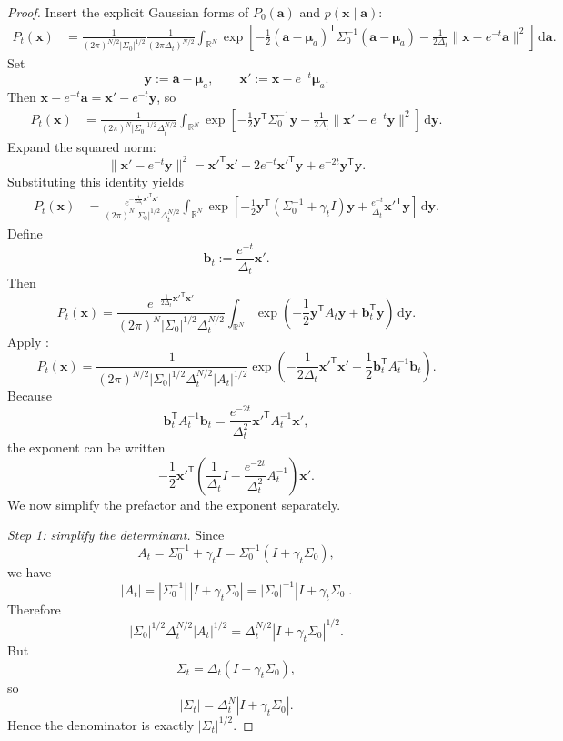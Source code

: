 \documentclass[11pt]{article}
\numberwithin{equation}{section}
\theoremstyle{definition}
\theoremstyle{remark}
\newcommand{\R}{\mathbb{R}}
\newcommand{\Id}{I}
\newcommand{\trans}{\mathsf{T}}
\newcommand{\diff}{\,\mathrm{d}}
\newcommand{\norm}[1]{\lVert #1\rVert}
\begin{document}
\begin{proof}
Insert the explicit Gaussian forms of $P_0(\mathbf a)$ and $p(\mathbf x\mid\mathbf a)$:
\begin{align*}
P_t(\mathbf x)
&=
\frac{1}{(2\pi)^{N/2}|\Sigma_0|^{1/2}}
\frac{1}{(2\pi\Delta_t)^{N/2}}
\int_{\R^N}
\exp\!\left[
-\frac12(\mathbf a-\boldsymbol{\mu}_a)^\trans\Sigma_0^{-1}(\mathbf a-\boldsymbol{\mu}_a)
-\frac{1}{2\Delta_t}\norm{\mathbf x-e^{-t}\mathbf a}^2
\right]\diff\mathbf a.
\end{align*}
Set
\[
\mathbf y:=\mathbf a-\boldsymbol{\mu}_a,
\qquad
\mathbf x':=\mathbf x-e^{-t}\boldsymbol{\mu}_a.
\]
Then $\mathbf x-e^{-t}\mathbf a=\mathbf x'-e^{-t}\mathbf y$, so
\begin{align*}
P_t(\mathbf x)
&=
\frac{1}{(2\pi)^N|\Sigma_0|^{1/2}\Delta_t^{N/2}}
\int_{\R^N}
\exp\!\left[
-\frac12\mathbf y^\trans\Sigma_0^{-1}\mathbf y
-\frac{1}{2\Delta_t}\norm{\mathbf x'-e^{-t}\mathbf y}^2
\right]\diff\mathbf y.
\end{align*}
Expand the squared norm:
\[
\norm{\mathbf x'-e^{-t}\mathbf y}^2
=
\mathbf x'^\trans\mathbf x' - 2e^{-t}\mathbf x'^\trans\mathbf y + e^{-2t}\mathbf y^\trans\mathbf y.
\]
Substituting this identity yields
\begin{align*}
P_t(\mathbf x)
&=
\frac{e^{-\frac{1}{2\Delta_t}\mathbf x'^\trans\mathbf x'}}{(2\pi)^N|\Sigma_0|^{1/2}\Delta_t^{N/2}}
\int_{\R^N}
\exp\!\left[
-\frac12\mathbf y^\trans(\Sigma_0^{-1}+\gamma_t\Id)\mathbf y
+\frac{e^{-t}}{\Delta_t}\mathbf x'^\trans\mathbf y
\right]\diff\mathbf y.
\end{align*}
Define
\[
\mathbf b_t:=\frac{e^{-t}}{\Delta_t}\mathbf x'.
\]
Then
\[
P_t(\mathbf x)
=
\frac{e^{-\frac{1}{2\Delta_t}\mathbf x'^\trans\mathbf x'}}{(2\pi)^N|\Sigma_0|^{1/2}\Delta_t^{N/2}}
\int_{\R^N}\exp\!\left(-\frac12\mathbf y^\trans A_t\mathbf y+\mathbf b_t^\trans\mathbf y\right)\diff\mathbf y.
\]
Apply :
\[
P_t(\mathbf x)
=
\frac{1}{(2\pi)^{N/2}|\Sigma_0|^{1/2}\Delta_t^{N/2}|A_t|^{1/2}}
\exp\!\left(
-\frac{1}{2\Delta_t}\mathbf x'^\trans\mathbf x'
+\frac12\mathbf b_t^\trans A_t^{-1}\mathbf b_t
\right).
\]
Because
\[
\mathbf b_t^\trans A_t^{-1}\mathbf b_t
=
\frac{e^{-2t}}{\Delta_t^2}\mathbf x'^\trans A_t^{-1}\mathbf x',
\]
the exponent can be written
\[
-\frac12\mathbf x'^\trans\left(
\frac{1}{\Delta_t}\Id-\frac{e^{-2t}}{\Delta_t^2}A_t^{-1}
\right)\mathbf x'.
\]
We now simplify the prefactor and the exponent separately.

\emph{Step 1: simplify the determinant.}
Since
\[
A_t=\Sigma_0^{-1}+\gamma_t\Id
=\Sigma_0^{-1}(\Id+\gamma_t\Sigma_0),
\]
we have
\[
|A_t|=|\Sigma_0^{-1}|\,|\Id+\gamma_t\Sigma_0|
=|\Sigma_0|^{-1}|\Id+\gamma_t\Sigma_0|.
\]
Therefore
\[
|\Sigma_0|^{1/2}\Delta_t^{N/2}|A_t|^{1/2}
=
\Delta_t^{N/2}|\Id+\gamma_t\Sigma_0|^{1/2}.
\]
But
\[
\Sigma_t=\Delta_t(\Id+\gamma_t\Sigma_0),
\]
so
\[
|\Sigma_t|=\Delta_t^N|\Id+\gamma_t\Sigma_0|.
\]
Hence the denominator is exactly $|\Sigma_t|^{1/2}$.


\end{proof}
\end{document}
